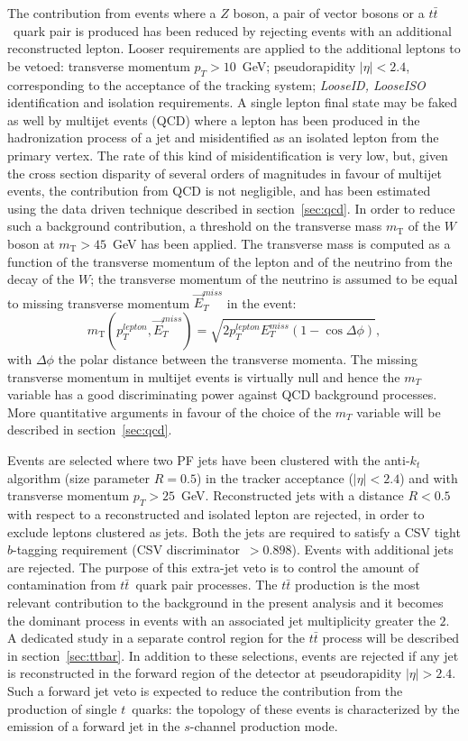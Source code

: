 The contribution from events where a $Z$ boson, a pair of vector bosons 
or a $t\bar{t}$~quark pair is produced has been reduced by rejecting 
events with an additional reconstructed lepton. Looser requirements 
are applied to the additional leptons to be vetoed: transverse momentum 
$p_{T} > 10$~GeV; pseudorapidity $|\eta| < 2.4$, corresponding to the 
acceptance of the tracking system; \textit{LooseID, LooseISO} identification 
and isolation requirements.
A single lepton final state may be faked as well by multijet events (QCD) where a lepton 
has been produced in the hadronization process of a jet and misidentified 
as an isolated lepton from the primary vertex.
The rate of this kind of misidentification is very low, but, given the cross 
section disparity of several orders of magnitudes in favour of multijet events,
the contribution from QCD is not negligible, and has been estimated using the data driven 
technique described in section~\ref{sec:qcd}. In order to reduce such a background 
contribution, a threshold on the transverse mass $m_{\mathrm{T}}$ of the $W$ boson
at $m_{\mathrm{T}} > 45$~GeV has been applied. 
The transverse mass is computed as a function of the 
transverse momentum of the lepton and of the neutrino from the decay of the $W$;
the transverse momentum of the neutrino is assumed to be equal to missing transverse 
momentum $\vec{E}_{T}^{miss}$ in the event:
$$ m_{\mathrm{T}}(p_{T}^{lepton}, \vec{E}_{T}^{miss}) = \sqrt{2 p_{T}^{lepton} E_{T}^{miss} (1-\cos \Delta\phi)} \mathrm{,}$$
with $\Delta\phi$ the polar distance between the transverse momenta.
The missing transverse momentum in multijet events is virtually null and hence the 
$m_{T}$ variable has a good discriminating power against QCD background 
processes. More quantitative arguments in favour of the choice of the $m_T$ variable will 
be described in section~\ref{sec:qcd}.

Events are selected where two PF jets have been clustered with the 
anti-$k_t$ algorithm (size parameter $R = 0.5$) in the tracker acceptance 
($|\eta| < 2.4$) and with transverse momentum $p_{T} > 25$~GeV.
Reconstructed jets with a distance $R < 0.5$ with respect to a reconstructed and isolated  
lepton are rejected, in order to exclude leptons clustered as jets.
Both the jets are required to satisfy a CSV tight $b$-tagging requirement
(CSV discriminator~$> 0.898$). 
Events with additional jets are rejected. The purpose of this extra-jet veto 
is to control the amount of contamination from $t\bar{t}$~quark pair processes.
The $t\bar{t}$ production is the most relevant contribution to the background 
in the present analysis and it becomes the dominant process in events with an 
associated jet multiplicity greater the $2$. 
A dedicated study in a separate control region for the $t\bar{t}$ process 
will be described in section~\ref{sec:ttbar}.
In addition to these selections, events are rejected if any jet is 
reconstructed in the forward region of the detector at pseudorapidity 
$|\eta| > 2.4$. Such a forward jet veto is expected to reduce the contribution 
from the production of single $t$~quarks: the topology of these events is 
characterized by the emission of a forward jet in the $s$-channel production mode.



